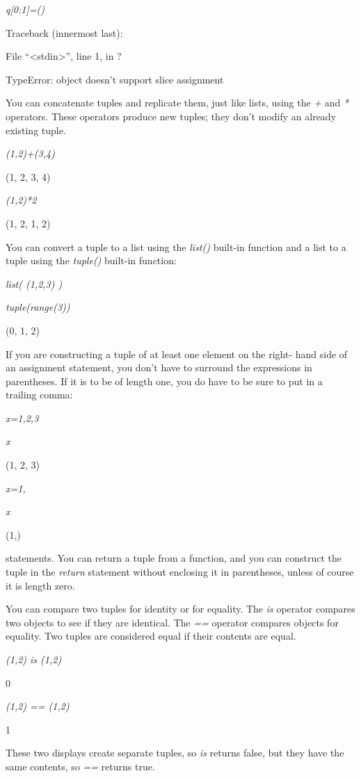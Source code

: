 \emph{q{[}0:1{]}=()}

Traceback (innermost last):

 File
``\textless{}stdin\textgreater{}'', line 1, in ?

TypeError: object doesn't support
slice assignment

You can concatenate tuples and
replicate them, just like lists, using the \emph{+} and \emph{*}
operators. These operators produce new tuples; they don't modify an
already existing tuple.


\emph{(1,2)+(3,4)}

(1, 2, 3, 4)


\emph{(1,2)*2}

(1, 2, 1, 2)

You can convert a tuple to a list
using the \emph{list()} built-in function and a list to a tuple using
the \emph{tuple()} built-in function:


\emph{list( (1,2,3) )}




\emph{tuple(range(3))}

(0, 1, 2)

If you are constructing a tuple of
at least one element on the right- hand side of an assignment statement,
you don't have to surround the expressions in parentheses. If it is to
be of length one, you do have to be sure to put in a trailing comma:


\emph{x=1,2,3}


\emph{x}

(1, 2, 3)


\emph{x=1,}


\emph{x}

(1,)


statements. You can return a tuple from a function, and you can
construct the tuple in the \emph{return} statement without enclosing it
in parentheses, unless of course it is length zero.

You can compare two tuples for
identity or for equality. The \emph{is} operator compares two objects to
see if they are identical. The \emph{==} operator compares objects for
equality. Two tuples are considered equal if their contents are equal.


\emph{(1,2) is (1,2)}

0


\emph{(1,2) == (1,2)}

1

These two displays create separate
tuples, so \emph{is} returns false, but they have the same contents, so
\emph{==} returns true.

